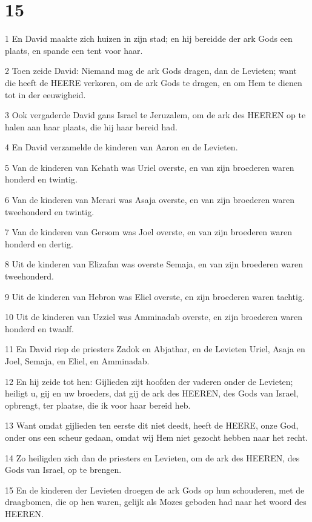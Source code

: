 \chapter{15}

\par 1 En David maakte zich huizen in zijn stad; en hij bereidde der ark Gods een plaats, en spande een tent voor haar.
\par 2 Toen zeide David: Niemand mag de ark Gods dragen, dan de Levieten; want die heeft de HEERE verkoren, om de ark Gods te dragen, en om Hem te dienen tot in der eeuwigheid.
\par 3 Ook vergaderde David gans Israel te Jeruzalem, om de ark des HEEREN op te halen aan haar plaats, die hij haar bereid had.
\par 4 En David verzamelde de kinderen van Aaron en de Levieten.
\par 5 Van de kinderen van Kehath was Uriel overste, en van zijn broederen waren honderd en twintig.
\par 6 Van de kinderen van Merari was Asaja overste, en van zijn broederen waren tweehonderd en twintig.
\par 7 Van de kinderen van Gersom was Joel overste, en van zijn broederen waren honderd en dertig.
\par 8 Uit de kinderen van Elizafan was overste Semaja, en van zijn broederen waren tweehonderd.
\par 9 Uit de kinderen van Hebron was Eliel overste, en zijn broederen waren tachtig.
\par 10 Uit de kinderen van Uzziel was Amminadab overste, en zijn broederen waren honderd en twaalf.
\par 11 En David riep de priesters Zadok en Abjathar, en de Levieten Uriel, Asaja en Joel, Semaja, en Eliel, en Amminadab.
\par 12 En hij zeide tot hen: Gijlieden zijt hoofden der vaderen onder de Levieten; heiligt u, gij en uw broeders, dat gij de ark des HEEREN, des Gods van Israel, opbrengt, ter plaatse, die ik voor haar bereid heb.
\par 13 Want omdat gijlieden ten eerste dit niet deedt, heeft de HEERE, onze God, onder ons een scheur gedaan, omdat wij Hem niet gezocht hebben naar het recht.
\par 14 Zo heiligden zich dan de priesters en Levieten, om de ark des HEEREN, des Gods van Israel, op te brengen.
\par 15 En de kinderen der Levieten droegen de ark Gods op hun schouderen, met de draagbomen, die op hen waren, gelijk als Mozes geboden had naar het woord des HEEREN.
